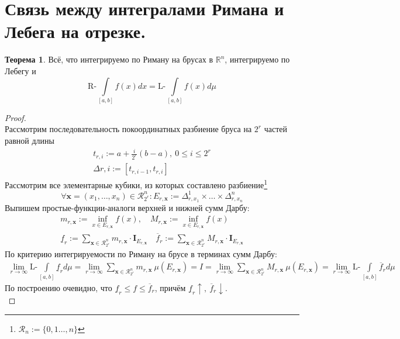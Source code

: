 \documentclass[11pt,a4paper]{report}
\def\Real{\mathbb{R}}
\theoremstyle{definition}
\theoremstyle{definition}
\newtheorem{theorem}{Теорема}[section]
\theoremstyle{definition}
\begin{document}
	\section{Связь между интегралами Римана и Лебега на отрезке.}
	\begin{theorem}
		Всё, что интегрируемо по Риману на брусах в $ \Real^{n} $, интегрируемо по Лебегу и
		\[ 
			\mbox{R-}\int\limits_{[a, b]} f(x) dx = \mbox{L-}\int\limits_{[a, b]} f(x) d\mu 
		\]
	\end{theorem}
	\begin{proof}$  $\\
		Рассмотрим последовательность покоординатных разбиение бруса на $ 2^{r} $ частей равной длины\\
		\begin{gather*}
			t_{r, i} := a + \frac{i}{2^{r}}(b - a),\ 0 \le i \le 2^{r}\\
			\Delta{r, i} := [t_{r, i-1}, t_{r, i}]
		\end{gather*}
		Рассмотрим все элементарные кубики, из которых составлено разбиение\footnote{$ \mathcal{R}_{n} := \{0, 1\dots, n\} $}
		\[
			\forall \mathbf{x} = (x_{1}, \dots, x_{n}) \in \mathcal{R}^{n}_{2^{r}} : E_{r, \mathbf{x}} := \Delta^{1}_{r, x_{1}} \times \dots \times \Delta^{n}_{r, x_{n}} 
		\]
		Выпишем простые-функции-аналоги верхней и нижней сумм Дарбу:
		\begin{gather*}
			m_{r, \mathbf{x}} := \inf\limits_{x \in E_{r, \mathbf{x}}} f(x),\quad
			M_{r, \mathbf{x}} := \inf\limits_{x \in E_{r, \mathbf{x}}} f(x)\\
			\underline{f}_{r} := \sum\limits_{\mathbf{x} \in \mathcal{R}^{n}_{2^{r}}} m_{r, \mathbf{x}} \cdot \mathbf{I}_{E_{r, \mathbf{x}}} \quad 
			\overline{f}_{r} := \sum\limits_{\mathbf{x} \in \mathcal{R}^{n}_{2^{r}}} M_{r, \mathbf{x}} \cdot \mathbf{I}_{E_{r, \mathbf{x}}}
		\end{gather*}
		По критерию интегрируемости по Риману на брусе в терминах сумм Дарбу:
		\begin{gather*}
			\lim\limits_{r\to\infty}\mbox{L-}\int\limits_{[a, b]} \underline{f}_{r} d\mu = \lim\limits_{r\to\infty} \sum\limits_{\mathbf{x} \in \mathcal{R}^{n}_{2^{r}}} m_{r, \mathbf{x}}\ \mu(E_{r, \mathbf{x}}) = I = \lim\limits_{r\to\infty} \sum\limits_{\mathbf{x} \in \mathcal{R}^{n}_{2^{r}}} M_{r, \mathbf{x}}\ \mu(E_{r, \mathbf{x}}) = \lim\limits_{r\to\infty}\mbox{L-}\int\limits_{[a, b]} \overline{f}_{r} d\mu
		\end{gather*}
		По построению очевидно, что $ \underline{f}_{r} \le f \le \overline{f}_{r} $, причём $ \underline{f}_{r} \uparrow,\ \overline{f}_{r} \downarrow $.\\

\end{proof}
\end{document}
